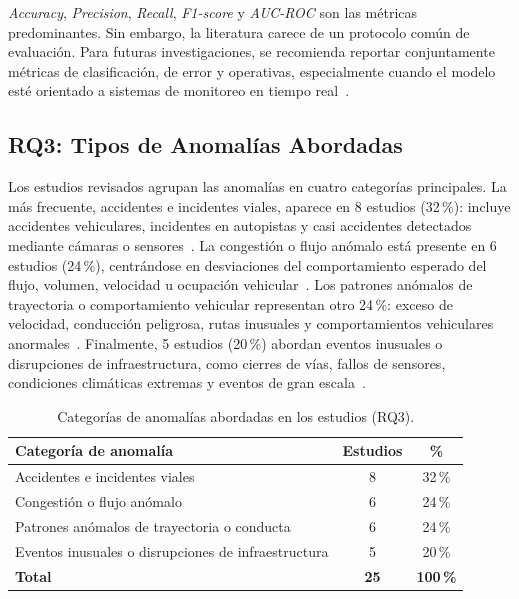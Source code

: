 \documentclass[12pt, a4paper]{article}
\begin{document}
\begin{hallazgo}[]
\textit{Accuracy}, \textit{Precision}, \textit{Recall}, \textit{F1-score} y \textit{AUC-ROC} son las m\'{e}tricas predominantes. Sin embargo, la literatura carece de un protocolo com\'{u}n de evaluaci\'{o}n. Para futuras investigaciones, se recomienda reportar conjuntamente m\'{e}tricas de clasificaci\'{o}n, de error y operativas, especialmente cuando el modelo est\'{e} orientado a sistemas de monitoreo en tiempo real~\cite{taheri2026applicability}.
\end{hallazgo}

\subsection{RQ3: Tipos de Anomal\'{i}as Abordadas}

Los estudios revisados agrupan las anomal\'{i}as en cuatro categor\'{i}as principales. La m\'{a}s frecuente, accidentes e incidentes viales, aparece en 8 estudios (32\,\%): incluye accidentes vehiculares, incidentes en autopistas y casi accidentes detectados mediante c\'{a}maras o sensores~\cite{fang2020deep,huang2020intelligent,khan2022anomaly,pawar2022deep}. La congesti\'{o}n o flujo an\'{o}malo est\'{a} presente en 6 estudios (24\,\%), centr\'{a}ndose en desviaciones del comportamiento esperado del flujo, volumen, velocidad u ocupaci\'{o}n vehicular~\cite{ren2024graph,mao2024detecting,jia2025prediction}. Los patrones an\'{o}malos de trayectoria o comportamiento vehicular representan otro 24\,\%: exceso de velocidad, conducci\'{o}n peligrosa, rutas inusuales y comportamientos vehiculares anormales~\cite{riaz2022traffic,chakraborty2023structural,wang2024multiscale}. Finalmente, 5 estudios (20\,\%) abordan eventos inusuales o disrupciones de infraestructura, como cierres de v\'{i}as, fallos de sensores, condiciones clim\'{a}ticas extremas y eventos de gran escala~\cite{cai2021road,hu2022detecting,nouri2025self}.

\begin{table}[H]
\centering
\caption{Categor\'{i}as de anomal\'{i}as abordadas en los estudios (RQ3).}
\label{tab:rq3}
\small
\begin{tabularx}{\linewidth}{Xcc}
\toprule
\textbf{Categor\'{i}a de anomal\'{i}a} & \textbf{Estudios} & \textbf{\%} \\
\midrule
Accidentes e incidentes viales                    & 8 & 32\,\% \\
Congesti\'{o}n o flujo an\'{o}malo                & 6 & 24\,\% \\
Patrones an\'{o}malos de trayectoria o conducta   & 6 & 24\,\% \\
Eventos inusuales o disrupciones de infraestructura & 5 & 20\,\% \\
\midrule
\textbf{Total} & \textbf{25} & \textbf{100\,\%} \\
\bottomrule
\end{tabularx}
\end{table}
\end{document}
